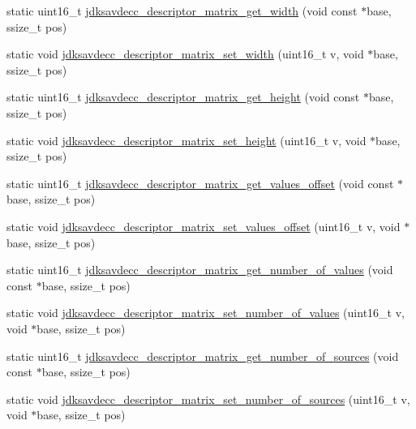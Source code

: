 \begin{DoxyCompactItemize}
\item 
static uint16\+\_\+t \hyperlink{group__descriptor__matrix_ga6459143f0bffb2ae98d4d4964cd7fb40}{jdksavdecc\+\_\+descriptor\+\_\+matrix\+\_\+get\+\_\+width} (void const $\ast$base, ssize\+\_\+t pos)
\item 
static void \hyperlink{group__descriptor__matrix_ga468599c96bd0f95821546b4a019be251}{jdksavdecc\+\_\+descriptor\+\_\+matrix\+\_\+set\+\_\+width} (uint16\+\_\+t v, void $\ast$base, ssize\+\_\+t pos)
\item 
static uint16\+\_\+t \hyperlink{group__descriptor__matrix_gab382908e84a397fe7857ab9a89db564f}{jdksavdecc\+\_\+descriptor\+\_\+matrix\+\_\+get\+\_\+height} (void const $\ast$base, ssize\+\_\+t pos)
\item 
static void \hyperlink{group__descriptor__matrix_ga5c4601f81e347dd3e1eed3d0346a4ca7}{jdksavdecc\+\_\+descriptor\+\_\+matrix\+\_\+set\+\_\+height} (uint16\+\_\+t v, void $\ast$base, ssize\+\_\+t pos)
\item 
static uint16\+\_\+t \hyperlink{group__descriptor__matrix_gaf0c5627079e77c22445bdadce94963ae}{jdksavdecc\+\_\+descriptor\+\_\+matrix\+\_\+get\+\_\+values\+\_\+offset} (void const $\ast$base, ssize\+\_\+t pos)
\item 
static void \hyperlink{group__descriptor__matrix_ga8b0e73869a2608ac9f11747e666515b0}{jdksavdecc\+\_\+descriptor\+\_\+matrix\+\_\+set\+\_\+values\+\_\+offset} (uint16\+\_\+t v, void $\ast$base, ssize\+\_\+t pos)
\item 
static uint16\+\_\+t \hyperlink{group__descriptor__matrix_gaff41215b6af4fd5df185b16cdae59c26}{jdksavdecc\+\_\+descriptor\+\_\+matrix\+\_\+get\+\_\+number\+\_\+of\+\_\+values} (void const $\ast$base, ssize\+\_\+t pos)
\item 
static void \hyperlink{group__descriptor__matrix_ga705fadd305ee372a565673f72a74804b}{jdksavdecc\+\_\+descriptor\+\_\+matrix\+\_\+set\+\_\+number\+\_\+of\+\_\+values} (uint16\+\_\+t v, void $\ast$base, ssize\+\_\+t pos)
\item 
static uint16\+\_\+t \hyperlink{group__descriptor__matrix_gae02dba28cb20ef60be25406cc13ed0bd}{jdksavdecc\+\_\+descriptor\+\_\+matrix\+\_\+get\+\_\+number\+\_\+of\+\_\+sources} (void const $\ast$base, ssize\+\_\+t pos)
\item 
static void \hyperlink{group__descriptor__matrix_ga5807db32c5c9af7038755f97d5e6a14d}{jdksavdecc\+\_\+descriptor\+\_\+matrix\+\_\+set\+\_\+number\+\_\+of\+\_\+sources} (uint16\+\_\+t v, void $\ast$base, ssize\+\_\+t pos)
\item 

\end{DoxyCompactItemize}
